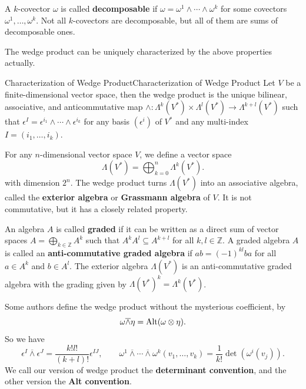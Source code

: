 \documentclass[../main.tex]{subfiles}
\begin{document}
A $k$-covector $\omega$ is called \textbf{decomposable} if $\omega = \omega^1 \wedge \cdots \wedge \omega^k$ for some covectors $\omega^1, \ldots , \omega^k$. Not all $k$-covectors are decomposable, but all of them are sums of decomposable ones.

The wedge product can be uniquely characterized by the above properties actually.
\begin{proposition}{Characterization of Wedge Product}{Characterization of Wedge Product}
  Let $V$ be a finite-dimensional vector space, then the wedge product is the unique bilinear, associative, and anticommutative map $\wedge : \Lambda^k(V^*) \times \Lambda^l(V^*) \to \Lambda^{k+l}(V^*)$ such that $\epsilon^I = \epsilon^{i_1} \wedge \cdots \wedge \epsilon^{i_k}$ for any basis $(\epsilon^i)$ of $V^*$ and any multi-index $I = (i_1, \dots, i_k)$.
\end{proposition}

For any $n$-dimensional vector space $V$, we define a vector space
\begin{equation}
  \Lambda(V^*) = \bigoplus_{k=0}^n \Lambda^k(V^*).
\end{equation}
with dimension $2^n$. The wedge product turns $\Lambda(V^*)$ into an associative algebra, called the \textbf{exterior algebra} or \textbf{Grassmann algebra} of $V$. It is not commutative, but it has a closely related property.

An algebra $A$ is called \textbf{graded} if it can be written as a direct sum of vector spaces $A = \bigoplus_{k\in \mathbb{Z}} A^k$ such that $A^k A^l \subseteq A^{k+l}$ for all $k,l\in \mathbb{Z}$. A graded algebra $A$ is called an \textbf{anti-commutative graded algebra} if $ab = (-1)^{kl} ba$ for all $a\in A^k$ and $b\in A^l$. The exterior algebra $\Lambda(V^*)$ is an anti-commutative graded algebra with the grading given by $\Lambda(V^*)^k = \Lambda^k(V^*)$.

Some authors define the wedge product without the mysterious coefficient, by
\begin{equation*}
  \omega \overline{\wedge} \eta = \operatorname{Alt}(\omega \otimes \eta).
\end{equation*}
So we have
\begin{equation*}
  \epsilon^I \overline{\wedge} \epsilon^J = \frac{k!l!}{(k+l)!} \epsilon^{IJ}, \qquad \omega^1 \overline{\wedge} \cdots \overline{\wedge} \omega^k (v_1, \dots, v_k) = \frac{1}{k!} \det(\omega^i(v_j)).
\end{equation*}
We call our version of wedge product the \textbf{determinant convention}, and the other version the \textbf{Alt convention}. 
\end{document}
